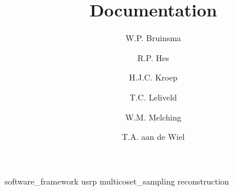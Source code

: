 \documentclass[a4paper, openany, oneside]{memoir}
\title{Documentation}
\author{W.P. Bruinsma \and R.P. Hes \and H.J.C. Kroep \and T.C. Leliveld \and W.M. Melching \and T.A. aan de Wiel}
\begin{document}
\frontmatter

\begin{titlingpage}
  \pagestyle{empty}
  \maketitle
\end{titlingpage}


\tableofcontents

\mainmatter

{software_framework}
{usrp}
{multicoset_sampling}
{reconstruction}


\appendix
\end{document}
